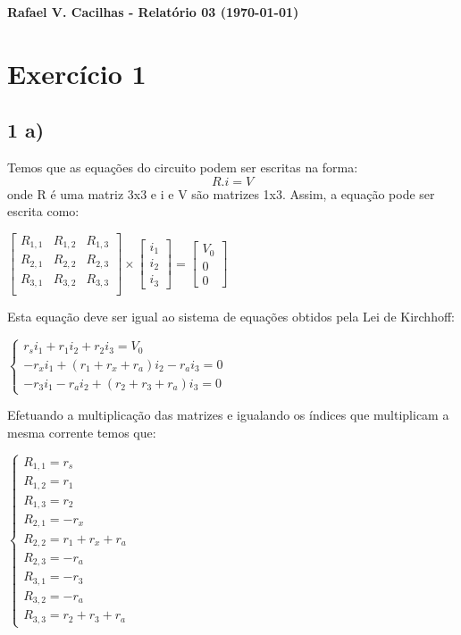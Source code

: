 \documentclass[a4wide]{report}
\begin{document}
\noindent
{\bf Rafael V. Cacilhas  - Relatório 03 (\today)}

\vspace{0.5cm}

\section*{Exercício 1}


\subsection*{1 a) }
Temos que as equações  do circuito podem ser escritas na forma:
\begin{equation}
R.i = V
\end{equation}
onde R é uma matriz 3x3 e i e V são matrizes 1x3. Assim, a equação pode ser escrita como:

$\begin{bmatrix} R_{1,1}  & R_{1,2}	&	R_{1,3} \\ R_{2,1}  & R_{2,2}	&	R_{2,3} \\R_{3,1}  & R_{3,2}	&	R_{3,3} \\ \end{bmatrix} \times \left[ \begin{array}{c} i_1 \\ i_2 \\ i_3 \end{array}\right]  =  \left[ \begin{array}{c} V_0 \\ 0 \\ 0 \end{array} \right] $

\vspace{1em}
Esta equação deve ser igual ao sistema de equações obtidos pela Lei de Kirchhoff:

$\begin{cases} 
r_{s} i_1 + r_1 i_2 + r_2 i_3 = V_0 \\ 
-r_{x} i_1 + (r_1 + r_x + r_a )i_2 - r_a i_3 = 0 \\  
-r_{3} i_1 -r_a i_2 + (r_2 + r_3 + r_a ) i_3 = 0
\end{cases} $

\vspace{1em}

Efetuando a multiplicação das matrizes e igualando os índices que multiplicam a mesma corrente temos que:

$\begin{cases} 
R_{1,1} = r_s \\ 
R_{1,2} = r_1 \\  
R_{1,3} = r_2 \\
R_{2,1} = -r_x \\ 
R_{2,2} = r_1 + r_x + r_a \\  
R_{2,3} = -r_a \\
R_{3,1} = -r_3 \\ 
R_{3,2} = -r_a \\  
R_{3,3} = r_2 + r_3 + r_a
\end{cases} $
\end{document}
